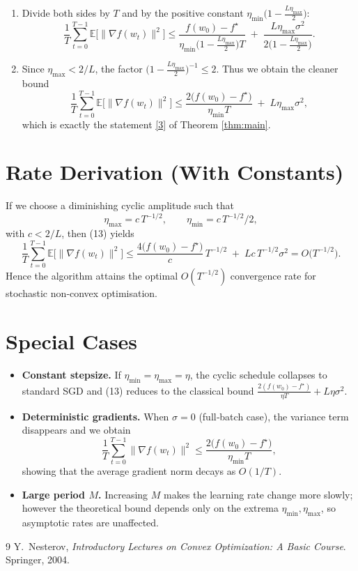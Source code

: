\documentclass{article}
\newcommand{\E}{\mathbb{E}}
\begin{document}
\begin{enumerate}
\item[Step 9.] Divide both sides by $T$ and by the positive constant
$\eta_{\min}\bigl(1-\frac{L\eta_{\max}}{2}\bigr)$:
\[
\frac{1}{T}\sum_{t=0}^{T-1}\E\!\big[\|\nabla f(w_t)\|^{2}\big]
\le
\frac{f(w_0)-f^\star}
{\eta_{\min}\bigl(1-\frac{L\eta_{\max}}{2}\bigr)T}
\;+\;
\frac{L\eta_{\max}\sigma^{2}}{2\bigl(1-\frac{L\eta_{\max}}{2}\bigr)}.
\tag{12}
\]

\item[Step 10.] Since $\eta_{\max}<2/L$, the factor
$\bigl(1-\frac{L\eta_{\max}}{2}\bigr)^{-1}\le 2$.
Thus we obtain the cleaner bound
\[
\frac{1}{T}\sum_{t=0}^{T-1}\E\!\big[\|\nabla f(w_t)\|^{2}\big]
\le
\frac{2\big(f(w_0)-f^\star\big)}{\eta_{\min}T}
\;+\;
L\eta_{\max}\sigma^{2},
\tag{13}
\]
which is exactly the statement \eqref{3} of Theorem \ref{thm:main}.
\end{enumerate}

\section*{Rate Derivation (With Constants)}
If we choose a diminishing cyclic amplitude such that
\[
\eta_{\max}=c\,T^{-1/2},\qquad 
\eta_{\min}=c\,T^{-1/2}/2,
\]
with $c<2/L$, then (13) yields
\[
\frac{1}{T}\sum_{t=0}^{T-1}\E\!\big[\|\nabla f(w_t)\|^{2}\big]
\le
\frac{4\big(f(w_0)-f^\star\big)}{c}\,T^{-1/2}
\;+\;
L c\,T^{-1/2}\sigma^{2}
=O\!\big(T^{-1/2}\big).
\]
Hence the algorithm attains the optimal $O(T^{-1/2})$ convergence rate
for stochastic non‑convex optimisation.

\section*{Special Cases}
\begin{itemize}
\item \textbf{Constant stepsize.}
If $\eta_{\min}=\eta_{\max}=\eta$, the cyclic schedule collapses to standard
SGD and (13) reduces to the classical bound
$\frac{2(f(w_0)-f^\star)}{\eta T}+L\eta\sigma^{2}$.
\item \textbf{Deterministic gradients.}
When $\sigma=0$ (full‑batch case), the variance term disappears and we obtain
\[
\frac{1}{T}\sum_{t=0}^{T-1}\|\nabla f(w_t)\|^{2}
\le \frac{2\big(f(w_0)-f^\star\big)}{\eta_{\min}T},
\]
showing that the average gradient norm decays as $O(1/T)$.
\item \textbf{Large period $M$.}
Increasing $M$ makes the learning rate change more slowly; however the
theoretical bound depends only on the extrema $\eta_{\min},\eta_{\max}$,
so asymptotic rates are unaffected.
\end{itemize}

\begin{thebibliography}{9}
Y.~Nesterov, \emph{Introductory Lectures on Convex Optimization: A Basic
Course}. Springer, 2004.
\end{thebibliography}
\end{document}
